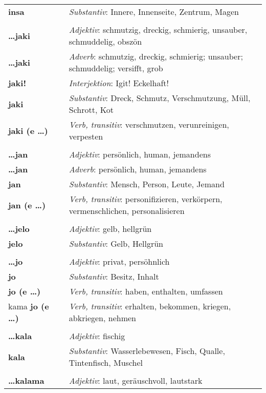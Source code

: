 \begin{supertabular}{p{2,5cm}|ll}
\textbf{insa} && \textit{Substantiv}: Innere, Innenseite, Zentrum, Magen \\ 
 && \\ %
\textbf{\dots jaki} && \textit{Adjektiv}: schmutzig, dreckig, schmierig, unsauber, schmuddelig, obszön \\ 
\textbf{\dots jaki} && \textit{Adverb}: schmutzig, dreckig, schmierig; unsauber; schmuddelig; versifft, grob\\ 
\textbf{jaki!} && \textit{Interjektion}: Igit! Eckelhaft! \\ 
\textbf{jaki} && \textit{Substantiv}: Dreck, Schmutz, Verschmutzung, Müll, Schrott, Kot \\ 
\textbf{jaki (e \dots)} && \textit{Verb, transitiv}: verschmutzen, verunreinigen, verpesten \\ 
 && \\ %
\textbf{\dots jan} && \textit{Adjektiv}: persönlich, human, jemandens \\ 
\textbf{\dots jan} && \textit{Adverb}: persönlich, human, jemandens \\ 
\textbf{jan} && \textit{Substantiv}: Mensch, Person, Leute, Jemand \\ 
\textbf{jan (e \dots)} && \textit{Verb, transitiv}: personifizieren, verkörpern, vermenschlichen, personalisieren \\ 
 && \\ %
\textbf{\dots jelo} && \textit{Adjektiv}: gelb, hellgrün \\ 
\textbf{jelo} && \textit{Substantiv}: Gelb, Hellgrün \\ 
 && \\ %
\textbf{\dots jo} && \textit{Adjektiv}: privat, persöhnlich \\ 
\textbf{jo} && \textit{Substantiv}: Besitz, Inhalt \\ 
\textbf{jo (e \dots)} && \textit{Verb, transitiv}: haben, enthalten, umfassen \\ 
kama \textbf{jo (e \dots)} && \textit{Verb, transitiv}: erhalten, bekommen, kriegen, abkriegen, nehmen \\ 
 && \\ %
\textbf{\dots kala} && \textit{Adjektiv}: fischig \\ 
\textbf{kala} && \textit{Substantiv}: Wasserlebewesen, Fisch, Qualle, Tintenfisch, Muschel \\ 
 && \\ %
\textbf{\dots kalama} && \textit{Adjektiv}: laut, geräuschvoll, lautstark \\

\end{supertabular}

